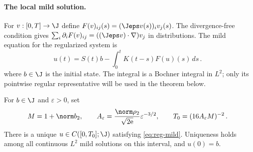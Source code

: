 \documentclass[11pt,reqno]{amsart}
\begin{document}
\paragraph{The local mild solution.}
For $v:[0,T]\to\J$ define
$F(v)_{ij}(s)=(\Jeps v(s))_i v_j(s)$. The divergence-free condition gives
$\sum_i\partial_iF(v)_{ij}=((\Jeps v)\cdot\nabla)v_j$ in distributions.
The mild equation for the regularized system is
\begin{equation}\label{eq:reg-mild}
  u(t)=S(t)b-\int_0^tK(t-s)F(u)(s)\,ds\,.
\end{equation}
where $b\in\J$ is the initial state.
The integral is a Bochner integral in $L^2$; only its pointwise regular
representative will be used in the theorem below.

\begin{lemma}\label{lem:reg-local-mild}
For $b\in\J$ and $\varepsilon>0$, set
\begin{equation}\label{eq:reg-lifespan}
  M=1+\norm b_2,\qquad
  A_\varepsilon=\frac{\norm\rho_2}{\sqrt{2\mathrm e}}\varepsilon^{-3/2},
  \qquad T_0=(16A_\varepsilon M)^{-2}\,.
\end{equation}
There is a unique $u\in C([0,T_0];\J)$ satisfying
\eqref{eq:reg-mild}. Uniqueness holds among all continuous $L^2$ mild
solutions on this interval, and $u(0)=b$.
\end{lemma}
\end{document}
